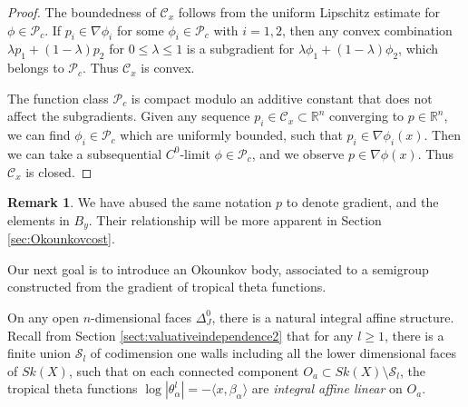 \documentclass[a4paper]{article}
\theoremstyle{definition}
\newtheorem{rmk}[thm]{Remark}
\newcommand{\R}{\mathbb{R}}
\begin{document}
\begin{proof}
The boundedness of $\mathcal{C}_x$ follows from the uniform Lipschitz estimate for $\phi\in \mathcal{P}_c$. If $p_i\in \nabla \phi_i$ for some $\phi_i\in \mathcal{P}_c$ with $i=1,2$, then any convex combination $\lambda p_1+ (1-\lambda) p_2$ for $0\leq \lambda\leq 1$ is a subgradient for 
$\lambda \phi_1+ (1-\lambda) \phi_2$, which belongs to $\mathcal{P}_c$. Thus $\mathcal{C}_x$ is convex.
	
	
	
	
The function class $\mathcal{P}_c$ is compact modulo an additive constant that does not affect the subgradients. Given any sequence $p_i\in \mathcal{C}_x\subset \R^n$ converging to $p\in \R^n$, we can find $\phi_i\in \mathcal{P}_c$ which are uniformly bounded, such that $p_i\in \nabla \phi_i(x)$. Then we can take a subsequential $C^0$-limit $\phi\in \mathcal{P}_c$, and we observe $p\in \nabla \phi(x)$. Thus $\mathcal{C}_x$ is closed. 
\end{proof}

	
	\begin{rmk}
		We have abused the same notation $p$ to denote gradient, and the elements in $B_y$. Their relationship will be more apparent in Section \ref{sec:Okounkovcost}.
	\end{rmk}
	
	
Our next goal is to introduce an Okounkov body, associated to a semigroup constructed from the gradient of tropical theta functions.
	
	
On any open $n$-dimensional faces $\Delta_J^0$, there is a natural integral affine structure.
Recall from Section \ref{sect:valuativeindependence2} that for any $l\geq 1$, there is a finite union $\mathcal{S}_l$ of codimension one walls including all the lower dimensional faces of $Sk(X)$, such that on each connected component $O_a\subset Sk(X)\setminus \mathcal{S}_l$, the tropical theta functions $\log |\theta_\alpha^l|= - \langle x, \beta_\alpha\rangle $ are \emph{integral affine linear} on $O_a$. 
\end{document}
